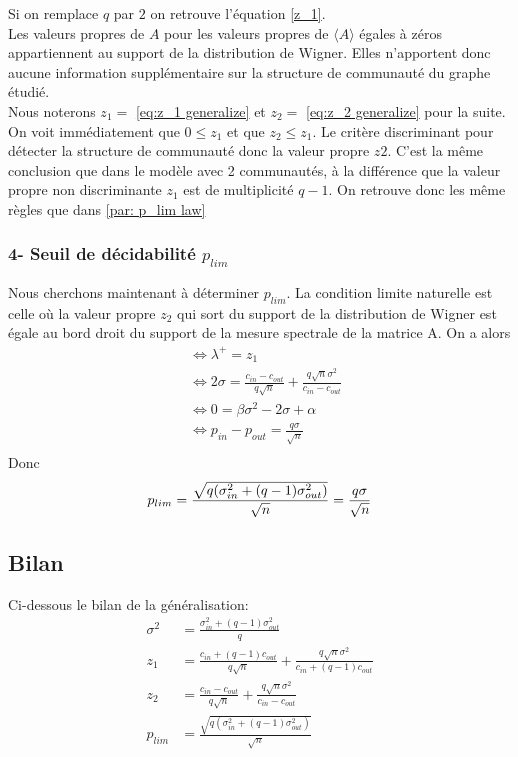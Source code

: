 Si on remplace $q$ par $2$ on retrouve l'équation \eqref{z_1}.\\
Les valeurs propres de $A$ pour les valeurs propres de $\langle A \rangle$ égales à zéros appartiennent au support de la distribution de Wigner.
Elles n'apportent donc aucune information supplémentaire sur la structure de communauté du graphe étudié.\\   

Nous noterons $z_1 =$ \eqref{eq:z_1 generalize}  et $z_2 =$ \eqref{eq:z_2 generalize} pour la suite.
On voit immédiatement que $0 \leq z_1$ et que $z_2 \leq z_1$. 
Le critère discriminant pour détecter la structure de communauté donc la valeur propre $z2$. 
C'est la même conclusion que dans le modèle avec 2 communautés, à la différence que la valeur propre non discriminante $z_1$ est de multiplicité $q-1$.
On retrouve donc les même règles que dans \autoref{par: p_lim law}
 

\subsubsection*{4- Seuil de décidabilité $p_{lim}$}
Nous cherchons maintenant à déterminer $p_{lim}$.
La condition limite naturelle est celle où la valeur propre $z_2$ qui sort du support de la distribution de Wigner est égale au bord droit du support de la mesure spectrale de la matrice A.
On a alors 
\begin{align*}
	&\Leftrightarrow \lambda^+ = z_1\\
	&\Leftrightarrow 2 \sigma = \frac{c_{in} - c_{out}}{q\sqrt{n}} + \frac{q\sqrt{n}\sigma^2}{c_{in} - c_{out}}\\
	&\Leftrightarrow 0 = \beta \sigma^2 - 2 \sigma + \alpha \\
	&\Leftrightarrow p_{in} - p_{out} = \frac{q\sigma}{\sqrt{n}}  \\
\end{align*}
Donc
\begin{equation}
	p_{lim} = \frac{\sqrt{q(\sigma_{in}^2 + (q-1)\sigma_{out}^2)}}{\sqrt{n}} = \frac{q\sigma}{\sqrt{n}}  \\
\end{equation}


\subsection{Bilan}
Ci-dessous le bilan de la généralisation:
\begin{align*}
	\sigma^2&= \frac{\sigma_{in}^2 + (q-1)\sigma_{out}^2}{q} \\
	z_1&= \frac{c_{in} + (q-1)c_{out}}{q\sqrt{n}} + \frac{q\sqrt{n}\sigma^2}{c_{in} + (q-1)c_{out}}\\
	z_2&= \frac{c_{in} - c_{out}}{q\sqrt{n}} + \frac{q\sqrt{n}\sigma^2}{c_{in} - c_{out}}\\
	p_{lim}&= \frac{\sqrt{q(\sigma_{in}^2 + (q-1)\sigma_{out}^2)}}{\sqrt{n}} \\
\end{align*}

